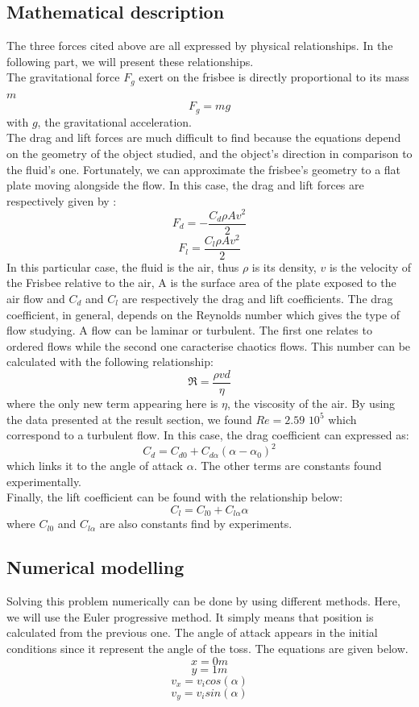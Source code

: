 \documentclass[10pt,a4paper]{report}
\begin{document}
\subsection{Mathematical description}
The three forces cited above are all expressed by physical relationships. In the following part, we will present these relationships.
\\The gravitational force $F_g$ exert on the frisbee is directly proportional to its mass $m$
\[F_g = m g\]
with $g$, the gravitational acceleration.
\\
The drag and lift forces are much difficult to find because the equations depend on the geometry of the object studied, and the object's direction in comparison to the fluid's one. Fortunately, we can approximate the frisbee's geometry to a flat plate moving alongside the flow. In this case, the drag and lift forces are respectively given by :
\[F_d = -\frac{C_d \rho A  v^2}{2}\]
\[F_l = \frac{C_l \rho A  v^2}{2}\]
In this particular case, the fluid is the air, thus $\rho$ is its density, $v$ is the velocity of the Frisbee relative to the air, A is the surface area of the plate exposed to the air flow and $C_d$ and $C_l$ are respectively the drag and lift coefficients.
The drag coefficient, in general, depends on the Reynolds number which gives the type of flow studying. A flow can be laminar or turbulent. The first one relates to ordered flows while the second one caracterise chaotics flows. This number can be calculated with the following relationship:
\[\Re = \frac{\rho v d}{\eta}\]
where the only new term appearing here is $\eta$, the viscosity of the air.
By using the data presented at the result section, we found $Re=2.59$ $10^5$ which correspond to a turbulent flow.
In this case, the drag coefficient can expressed as:
\[C_d = C_{d0} + C_{d\alpha}(\alpha-\alpha_0)^2\]
\cite{art5}
which links it to the angle of attack $\alpha$. The other terms are constants found experimentally.
\\Finally, the lift coefficient can be found with the relationship below:
\[C_l = C_{l0} + C_{l \alpha} \alpha\]
\cite{art5}
where $C_{l0}$ and $C_{l\alpha}$ are also constants find by experiments.
\subsection{Numerical modelling}
Solving this problem numerically can be done by using different methods. Here, we will use the Euler progressive method. It simply means that position is calculated from the previous one.
The angle of attack appears in the initial conditions since it represent the angle of the toss. The equations are given below.
\[x = 0 m\]
\[y = 1 m\]
\[v_x = v_i cos(\alpha) \]
\[v_y = v_i sin(\alpha) \] 
\cite{art5}
\end{document}
